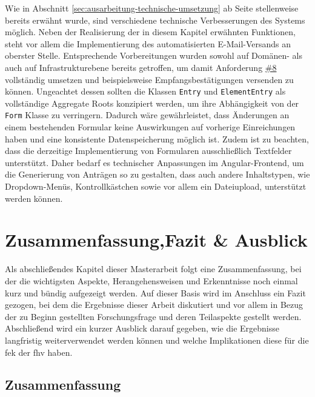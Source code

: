 \documentclass[a4paper,12pt,twoside,numbers=noendperiod]{scrreprt}
\begin{document}
Wie in Abschnitt \ref{sec:ausarbeitung-technische-umsetzung} ab Seite \pageref{sec:ausarbeitung-technische-umsetzung} stellenweise bereits erwähnt wurde, sind verschiedene technische Verbesserungen des Systems möglich. Neben der Realisierung der in diesem Kapitel erwähnten Funktionen, steht vor allem die Implementierung des automatisierten E-Mail-Versands an oberster Stelle. Entsprechende Vorbereitungen wurden sowohl auf Domänen- als auch auf Infrastrukturebene bereits getroffen, um damit Anforderung \hyperref[sub-sub-sec:abgeleitete-anforderungen-nach-einreichung]{\#8} vollständig umsetzen und beispielsweise Empfangsbestätigungen versenden zu können. Ungeachtet dessen sollten die Klassen \texttt{Entry} und \texttt{ElementEntry} als vollständige Aggregate Roots konzipiert werden, um ihre Abhängigkeit von der \texttt{Form} Klasse zu verringern. Dadurch wäre gewährleistet, dass Änderungen an einem bestehenden Formular keine Auswirkungen auf vorherige Einreichungen haben und eine konsistente Datenspeicherung möglich ist. Zudem ist zu beachten, dass die derzeitige Implementierung von Formularen ausschließlich Textfelder unterstützt. Daher bedarf es technischer Anpassungen im Angular-Frontend, um die Generierung von Anträgen so zu gestalten, dass auch andere Inhaltstypen, wie Dropdown-Menüs, Kontrollkästchen sowie vor allem ein Dateiupload, unterstützt werden können.

\cleardoublepage
\chapter[Zusammenfassung, Fazit \& Ausblick]{Zusammenfassung,\newline Fazit \& Ausblick}
\label{chap:zusammenfassung-Fazit-ausblick}

Als abschließendes Kapitel dieser Masterarbeit folgt eine Zusammenfassung, bei der die wichtigsten Aspekte, Herangehensweisen und Erkenntnisse noch einmal kurz und bündig aufgezeigt werden. Auf dieser Basis wird im Anschluss ein Fazit gezogen, bei dem die Ergebnisse dieser Arbeit diskutiert und vor allem in Bezug der zu Beginn gestellten Forschungsfrage und deren Teilaspekte gestellt werden. Abschließend wird ein kurzer Ausblick darauf gegeben, wie die Ergebnisse langfristig weiterverwendet werden können und welche Implikationen diese für die \acl{fek} der \acl{fhv} haben.

\section{Zusammenfassung}
\label{sec:zuammenfassung}
\end{document}
